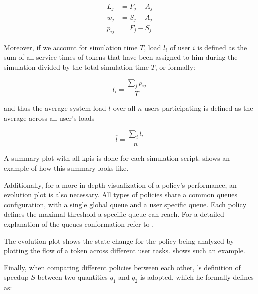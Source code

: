 \documentclass[draft=false]{seal_thesis}
\begin{document}
\begin{align}
	L_j&=F_j-A_j \label{eq:lateness}\\
	w_j&=S_j-A_j \\
	p_{ij}&=F_j-S_j
\end{align}

Moreover, if we account for simulation time $T$, load $l_i$ of user $i$ is defined as the sum of all service times of tokens that have been assigned to him during the simulation divided by the total simulation time $T$, or formally:

\begin{equation}
	l_i=\frac{\sum_j p_{ij}}{T}
\end{equation}

and thus the average system load $\overline{l}$ over all $n$ users participating is defined as the average across all user's loads \ie

\begin{equation}
	\overline{l} = \frac{\sum_i l_i}{n}
\end{equation}

A summary plot with all \glspl{kpi} is done for each simulation script.  shows an example of how this summary looks like.


Additionally, for a more in depth visualization of a policy's performance, an evolution plot is also necessary. All types of policies share a common queues configuration, with a single global queue and a user specific queue. Each policy defines the maximal threshold a specific queue can reach. For a detailed explanation of the queues conformation refer to .

The evolution plot shows the state change for the policy being analyzed by plotting the flow of a token across different user tasks.  shows such an example.


Finally, when comparing different policies between each other, \citet{Milo2012}'s definition of speedup $S$ between two quantities $q_1$ and $q_2$ is adopted, which he formally defines as:
\end{document}
